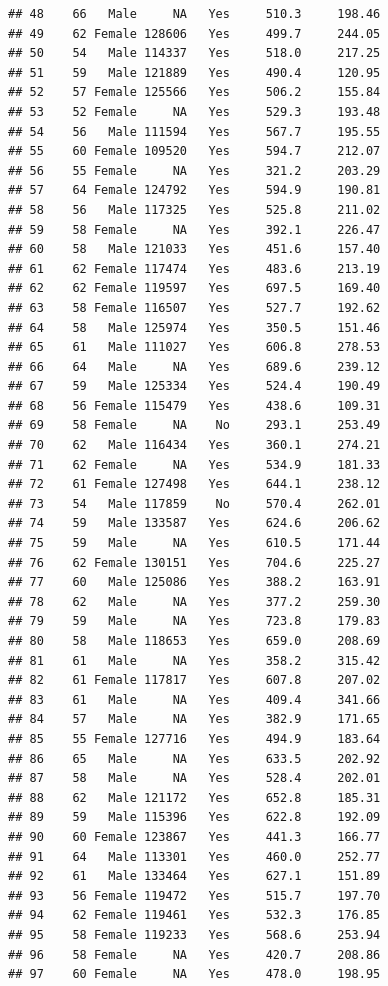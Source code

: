 \documentclass[12pt,]{krantz}
\theoremstyle{definition}
\theoremstyle{definition}
\theoremstyle{remark}
\begin{document}
\begin{verbatim}
## 48    66   Male     NA   Yes     510.3     198.46
## 49    62 Female 128606   Yes     499.7     244.05
## 50    54   Male 114337   Yes     518.0     217.25
## 51    59   Male 121889   Yes     490.4     120.95
## 52    57 Female 125566   Yes     506.2     155.84
## 53    52 Female     NA   Yes     529.3     193.48
## 54    56   Male 111594   Yes     567.7     195.55
## 55    60 Female 109520   Yes     594.7     212.07
## 56    55 Female     NA   Yes     321.2     203.29
## 57    64 Female 124792   Yes     594.9     190.81
## 58    56   Male 117325   Yes     525.8     211.02
## 59    58 Female     NA   Yes     392.1     226.47
## 60    58   Male 121033   Yes     451.6     157.40
## 61    62 Female 117474   Yes     483.6     213.19
## 62    62 Female 119597   Yes     697.5     169.40
## 63    58 Female 116507   Yes     527.7     192.62
## 64    58   Male 125974   Yes     350.5     151.46
## 65    61   Male 111027   Yes     606.8     278.53
## 66    64   Male     NA   Yes     689.6     239.12
## 67    59   Male 125334   Yes     524.4     190.49
## 68    56 Female 115479   Yes     438.6     109.31
## 69    58 Female     NA    No     293.1     253.49
## 70    62   Male 116434   Yes     360.1     274.21
## 71    62 Female     NA   Yes     534.9     181.33
## 72    61 Female 127498   Yes     644.1     238.12
## 73    54   Male 117859    No     570.4     262.01
## 74    59   Male 133587   Yes     624.6     206.62
## 75    59   Male     NA   Yes     610.5     171.44
## 76    62 Female 130151   Yes     704.6     225.27
## 77    60   Male 125086   Yes     388.2     163.91
## 78    62   Male     NA   Yes     377.2     259.30
## 79    59   Male     NA   Yes     723.8     179.83
## 80    58   Male 118653   Yes     659.0     208.69
## 81    61   Male     NA   Yes     358.2     315.42
## 82    61 Female 117817   Yes     607.8     207.02
## 83    61   Male     NA   Yes     409.4     341.66
## 84    57   Male     NA   Yes     382.9     171.65
## 85    55 Female 127716   Yes     494.9     183.64
## 86    65   Male     NA   Yes     633.5     202.92
## 87    58   Male     NA   Yes     528.4     202.01
## 88    62   Male 121172   Yes     652.8     185.31
## 89    59   Male 115396   Yes     622.8     192.09
## 90    60 Female 123867   Yes     441.3     166.77
## 91    64   Male 113301   Yes     460.0     252.77
## 92    61   Male 133464   Yes     627.1     151.89
## 93    56 Female 119472   Yes     515.7     197.70
## 94    62 Female 119461   Yes     532.3     176.85
## 95    58 Female 119233   Yes     568.6     253.94
## 96    58 Female     NA   Yes     420.7     208.86
## 97    60 Female     NA   Yes     478.0     198.95

\end{verbatim}
\end{document}
